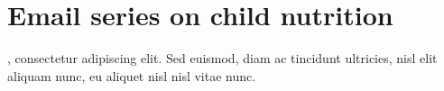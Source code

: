 \section{Email series on child nutrition}


, consectetur adipiscing elit. Sed euismod, diam ac tincidunt ultricies, nisl elit aliquam nunc, eu aliquet nisl nisl vitae nunc.

